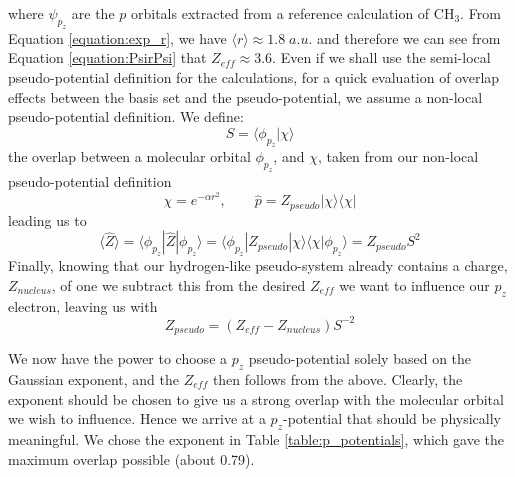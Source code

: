 \documentclass[journal=jctcce,manuscript=article]{achemso}
\begin{document}

 where \(\psi_{p_{z}}\) are the \(p\) orbitals extracted from a reference calculation of CH\(_{3}\). From Equation \ref{equation:exp_r}, we have \( \langle r \rangle \approx 1.8\;a.u.\) and therefore we can see from Equation \ref{equation:PsirPsi} that \(Z_{eff} \approx 3.6\). Even if we shall use the semi-local pseudo-potential definition for the calculations, for a quick evaluation of overlap effects between the basis set and the pseudo-potential, we assume a non-local pseudo-potential definition. We define:
\begin{equation}
S = \langle \phi_{p_{z}} | \chi \rangle
\end{equation}
the overlap between a molecular orbital \(\phi_{p_{z}}\), and \(\chi\), taken from our non-local pseudo-potential definition \cite{huzinaga_effective_1991}
\begin{equation}
\chi = e^{-\alpha r^{2}},\qquad \widehat{p} = Z_{pseudo} | \chi \rangle \langle \chi |
\end{equation}
leading us to
\begin{equation}
\langle \widehat{Z} \rangle = \langle \phi_{p_{z}} | \widehat{Z} | \phi_{p_{z}} \rangle = \langle \phi_{p_{z}} | Z_{pseudo} | \chi \rangle \langle \chi | \phi_{p_{z}} \rangle = Z_{pseudo} S^{2}
\end{equation}
Finally, knowing that our hydrogen-like pseudo-system already contains a charge, \(Z_{nucleus}\), of one we subtract this from the desired \(Z_{eff}\) we want to influence our \(p_{z}\) electron, leaving us with
\begin{equation}
Z_{pseudo} = (Z_{eff} - Z_{nucleus})S^{-2}
\end{equation}

We now have the power to choose a \(p_{z}\) pseudo-potential solely based on the Gaussian exponent, and the \(Z_{eff}\) then follows from the above. Clearly, the exponent should be chosen to give us a strong overlap with the molecular orbital we wish to influence. Hence we arrive at a \(p_{z}\)-potential that should be physically meaningful. We chose the exponent in Table \ref{table:p_potentials}, which gave the maximum overlap possible (about 0.79).
\end{document}
